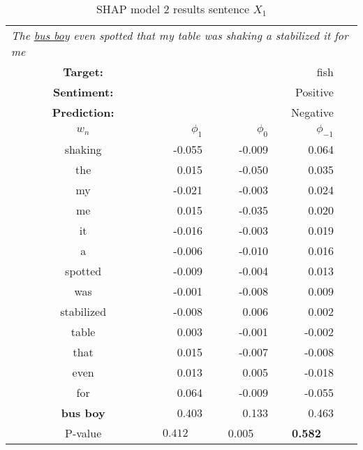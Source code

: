 \vspace{\baselineskip}
\begin{table}[ht]
\caption{SHAP model 2 results sentence $X_1$}
\centering
\begin{tabular}{p{21mm} c r r r c}
\multicolumn{6}{l}{{\textit{The  \underline{bus boy} even spotted that my table was shaking a stabilized it for me}}}\\
\cmidrule(lr){2-5}%
&\textbf{Target:}    &   \multicolumn{3}{r}{fish}\\
&\textbf{Sentiment:} & \multicolumn{3}{r}{Positive}\\
&\textbf{Prediction:} & \multicolumn{3}{r}{Negative}\\
\cmidrule(lr){2-5}
&$w_n$           &   $\phi_1$    &   $\phi_0$    & $\phi_{-1}$\\
\cmidrule(lr){2-2}     \cmidrule(lr){3-5}%
&shaking            &   -0.055  &   -0.009  &   0.064\\
&the                &   0.015   &   -0.050  &   0.035\\
&my                 &   -0.021  &   -0.003  &   0.024\\
&me                 &   0.015   &   -0.035  &   0.020\\
&it                 &   -0.016  &   -0.003  &   0.019\\
&a                  &   -0.006  &   -0.010  &   0.016\\
&spotted            &   -0.009  &   -0.004  &   0.013\\
&was                &   -0.001  &   -0.008  &   0.009\\
&stabilized         &   -0.008  &   0.006   &   0.002\\
&table              &   0.003   &   -0.001  &   -0.002\\
&that               &   0.015   &   -0.007  &   -0.008\\
&even               &   0.013   &   0.005   &   -0.018\\
&for                &   0.064   &   -0.009  &   -0.055\\
&\textbf{bus boy}   &   0.403   &   0.133   &   0.463\\
\cmidrule(lr){2-5}
&P-value & \multicolumn{1}{c}{$0.412$} & \multicolumn{1}{c}{0.005} & \multicolumn{1}{c}{\textbf{0.582}}
\end{tabular}
\label{tab:shap2_sen1}
\end{table}

